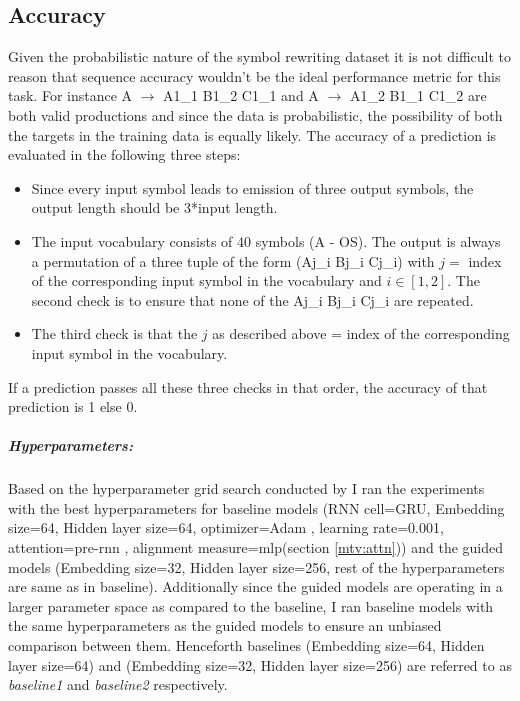 \subsection{Accuracy}\label{sr:acc_desc}
Given the probabilistic nature of the symbol rewriting dataset it is not difficult to reason that sequence accuracy wouldn't be the ideal performance metric for this task. For instance A $\rightarrow$ A1\_1 B1\_2 C1\_1 and A $\rightarrow$ A1\_2 B1\_1 C1\_2 are both valid productions and since the data is probabilistic, the possibility of both the targets in the training data is equally likely. The accuracy of a prediction is evaluated in the following three steps:
\begin{itemize}
	\item Since every input symbol leads to emission of three output symbols, the output length should be 3*input length.
	\item The input vocabulary consists of 40 symbols (A - OS). The output is always a permutation of a three tuple of the form (Aj\_i Bj\_i Cj\_i) with $j=$ index of the corresponding input symbol in the vocabulary and $i \in [1, 2] $. The second check is to ensure that none of the Aj\_i Bj\_i Cj\_i are repeated.
	\item The third check is that the $j$ as described above = index of the corresponding input symbol in the vocabulary.
\end{itemize}
If a prediction passes all these three checks in that order, the accuracy of that prediction is 1 else 0.

\subparagraph{Hyperparameters:} Based on the hyperparameter grid search conducted by \cite{Hupkes2018} I ran the experiments with the best hyperparameters for baseline models (RNN cell=GRU, Embedding size=64, Hidden layer size=64, optimizer=Adam \citep{KingmaB14}, learning rate=0.001, attention=pre-rnn \citep{Bahdanau2014}, alignment measure=mlp(section \ref{mtv:attn})) and the guided models (Embedding size=32, Hidden layer size=256, rest of the hyperparameters are same as in baseline). Additionally since the guided models are operating in a larger parameter space as compared to the baseline, I ran baseline models with the same hyperparameters as the guided models to ensure an unbiased comparison between them. Henceforth baselines (Embedding size=64, Hidden layer size=64) and (Embedding size=32, Hidden layer size=256) are referred to as \textit{baseline1} and \textit{baseline2} respectively.

